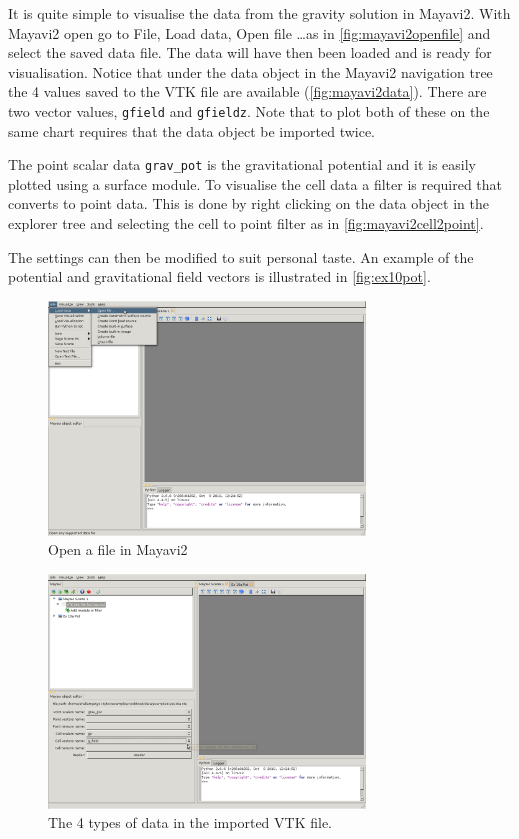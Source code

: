 It is quite simple to visualise the data from the gravity solution in Mayavi2.
With Mayavi2 open go to File, Load data, Open file \ldots as in
\autoref{fig:mayavi2openfile} and select the saved data file. The data will
have then been loaded and is ready for visualisation. Notice that under the data
object in the Mayavi2 navigation tree the 4 values saved to the VTK file are
available (\autoref{fig:mayavi2data}). There are two vector values,
\verb|gfield| and \verb|gfieldz|. Note that to plot both of these on the same
chart requires that the data object be imported twice.

The point scalar data \verb|grav_pot| is the gravitational potential and it is
easily plotted using a surface module. To visualise the cell data a filter is
required that converts to point data. This is done by right clicking on the data
object in the explorer tree and selecting the cell to point filter as in
\autoref{fig:mayavi2cell2point}.

The settings can then be modified to suit personal taste. An example of the
potential and gravitational field vectors is illustrated in
\autoref{fig:ex10pot}.

\begin{figure}[ht]
\centering
\includegraphics[width=0.75\textwidth]{figures/mayavi2_openfile.png}
\caption{Open a file in Mayavi2}
\label{fig:mayavi2openfile}
\end{figure}

\begin{figure}[ht]
\centering
\includegraphics[width=0.75\textwidth]{figures/mayavi2_data.png}
\caption{The 4 types of data in the imported VTK file.}
\label{fig:mayavi2data}
\end{figure}

